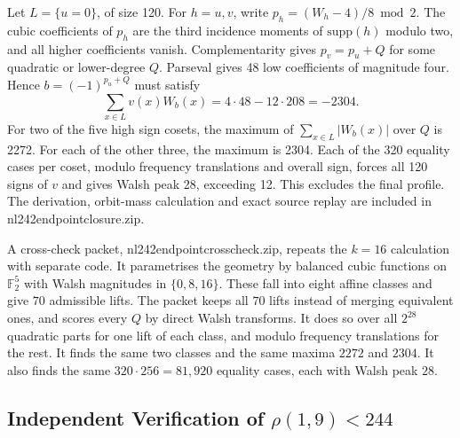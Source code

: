 \documentclass[11pt]{article}
\theoremstyle{definition}
\newcommand{\F}{\mathbb{F}}
\newcommand{\code}[1]{{\ttfamily\small\renewcommand{\_}{\textunderscore\allowbreak}#1}}
\begin{document}
Let $L=\{u=0\}$, of size 120. For $h=u,v$, write $p_h=(W_h-4)/8\bmod2$. The cubic coefficients of $p_h$ are the third incidence moments of $\mathrm{supp}(h)$ modulo two, and all higher coefficients vanish. Complementarity gives $p_v=p_u+Q$ for some quadratic or lower-degree $Q$. Parseval gives 48 low coefficients of magnitude four. Hence $b=(-1)^{p_u+Q}$ must satisfy
\[
  \sum_{x\in L} v(x)W_b(x)=4\cdot48-12\cdot208=-2304.
\]
For two of the five high sign cosets, the maximum of $\sum_{x\in L}|W_b(x)|$ over $Q$ is 2272. For each of the other three, the maximum is 2304. Each of the 320 equality cases per coset, modulo frequency translations and overall sign, forces all 120 signs of $v$ and gives Walsh peak 28, exceeding 12. This excludes the final profile. The derivation, orbit-mass calculation and exact source replay are included in \code{nl242\_endpoint\_closure.zip}.

A cross-check packet, \code{nl242\_endpoint\_crosscheck.zip}, repeats the $k=16$ calculation with separate code. It parametrises the geometry by balanced cubic functions on $\F_2^5$ with Walsh magnitudes in $\{0,8,16\}$. These fall into eight affine classes and give $70$ admissible lifts. The packet keeps all $70$ lifts instead of merging equivalent ones, and scores every $Q$ by direct Walsh transforms. It does so over all $2^{28}$ quadratic parts for one lift of each class, and modulo frequency translations for the rest. It finds the same two classes and the same maxima $2272$ and $2304$. It also finds the same $320\cdot256=81{,}920$ equality cases, each with Walsh peak $28$.

\subsection{Independent Verification of $\rho(1,9) < 244$}
\label{sec:nl244}
\end{document}

